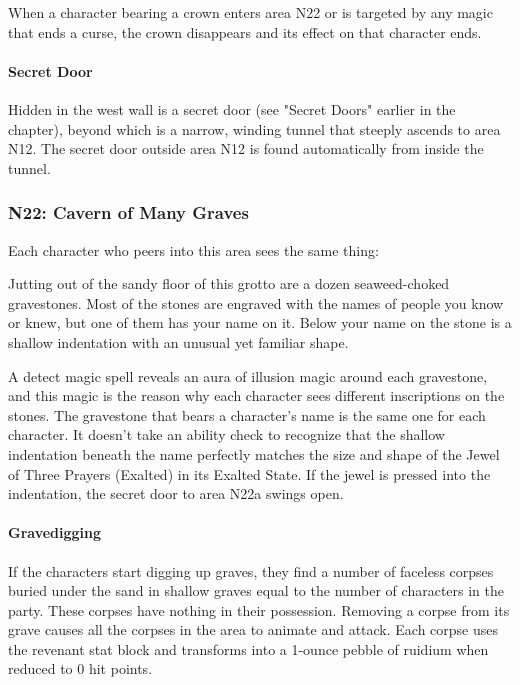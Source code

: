 \documentclass[10pt,a4paper,twoside,bg=print,twocolumn,openany,nodeprecatedcode]{dndbook}
\begin{document}
When a character bearing a crown enters area N22 or is targeted by any magic that ends a curse, the crown disappears and its effect on that character ends.

\paragraph{Secret Door}
Hidden in the west wall is a secret door (see "Secret Doors" earlier in the chapter), beyond which is a narrow, winding tunnel that steeply ascends to area N12. The secret door outside area N12 is found automatically from inside the tunnel.

\subsubsection{N22: Cavern of Many Graves}
Each character who peers into this area sees the same thing:

\begin{DndReadAloud}{}
Jutting out of the sandy floor of this grotto are a dozen seaweed-choked gravestones. Most of the stones are engraved with the names of people you know or knew, but one of them has your name on it. Below your name on the stone is a shallow indentation with an unusual yet familiar shape.

\end{DndReadAloud}

A detect magic spell reveals an aura of illusion magic around each gravestone, and this magic is the reason why each character sees different inscriptions on the stones. The gravestone that bears a character's name is the same one for each character. It doesn't take an ability check to recognize that the shallow indentation beneath the name perfectly matches the size and shape of the Jewel of Three Prayers (Exalted) in its Exalted State. If the jewel is pressed into the indentation, the secret door to area N22a swings open.

\paragraph{Gravedigging}
If the characters start digging up graves, they find a number of faceless corpses buried under the sand in shallow graves equal to the number of characters in the party. These corpses have nothing in their possession. Removing a corpse from its grave causes all the corpses in the area to animate and attack. Each corpse uses the revenant stat block and transforms into a 1-ounce pebble of ruidium when reduced to 0 hit points.
\end{document}
